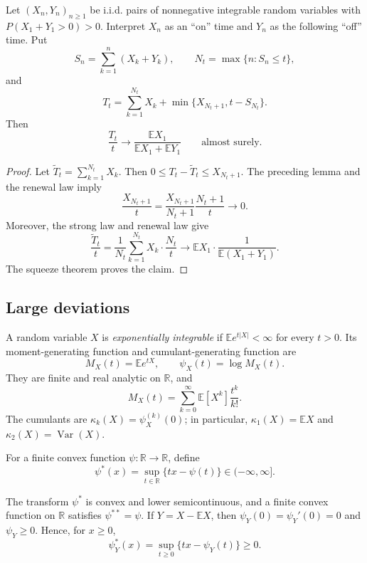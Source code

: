 \begin{thm}
Let $(X_n,Y_n)_{n\geq1}$ be i.i.d. pairs of nonnegative integrable random
variables with $P(X_1+Y_1>0)>0$. Interpret $X_n$ as an ``on'' time and $Y_n$
as the following ``off'' time. Put
\[
S_n=\sum_{k=1}^{n}(X_k+Y_k),
\qquad
N_t=\max\{n:S_n\leq t\},
\]
and
\[
T_t=\sum_{k=1}^{N_t}X_k
    +\min\{X_{N_t+1},t-S_{N_t}\}.
\]
Then
\[
\frac{T_t}{t}\longrightarrow
\frac{\mathbb EX_1}{\mathbb EX_1+\mathbb EY_1}
\qquad\text{almost surely}.
\]
\end{thm}

\begin{proof}
Let $\widetilde T_t=\sum_{k=1}^{N_t}X_k$. Then
$0\leq T_t-\widetilde T_t\leq X_{N_t+1}$. The preceding lemma and the renewal
law imply
\[
\frac{X_{N_t+1}}t
 =\frac{X_{N_t+1}}{N_t+1}\frac{N_t+1}{t}\to0.
\]
Moreover, the strong law and renewal law give
\[
\frac{\widetilde T_t}{t}
 =\frac1{N_t}\sum_{k=1}^{N_t}X_k\cdot\frac{N_t}{t}
 \longrightarrow
 \mathbb EX_1\cdot
 \frac1{\mathbb E(X_1+Y_1)}.
\]
The squeeze theorem proves the claim.
\end{proof}

\subsection{Large deviations}

\begin{de}
A random variable $X$ is \emph{exponentially integrable} if
$\mathbb E e^{t|X|}<\infty$ for every $t>0$. Its moment-generating function
and cumulant-generating function are
\[
M_X(t)=\mathbb E e^{tX},
\qquad
\psi_X(t)=\log M_X(t).
\]
They are finite and real analytic on $\mathbb R$, and
\[
M_X(t)=\sum_{k=0}^{\infty}\mathbb E[X^k]\frac{t^k}{k!}.
\]
The cumulants are $\kappa_k(X)=\psi_X^{(k)}(0)$; in particular,
$\kappa_1(X)=\mathbb EX$ and $\kappa_2(X)=\operatorname{Var}(X)$.
\end{de}

\begin{de}
For a finite convex function $\psi:\mathbb R\to\mathbb R$, define
\[
\psi^*(x)=\sup_{t\in\mathbb R}\{tx-\psi(t)\}
 \in(-\infty,\infty].
\]
\end{de}

\begin{prop}
The transform $\psi^*$ is convex and lower semicontinuous, and a finite convex
function on $\mathbb R$ satisfies $\psi^{**}=\psi$. If
$Y=X-\mathbb EX$, then $\psi_Y(0)=\psi_Y'(0)=0$ and $\psi_Y\geq0$. Hence, for
$x\geq0$,
\[
\psi_Y^*(x)=\sup_{t\geq0}\{tx-\psi_Y(t)\}\geq0.
\]
\end{prop}

